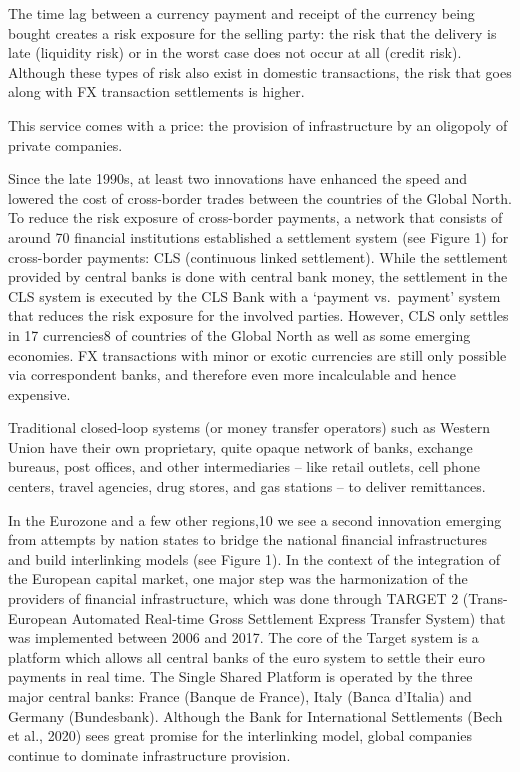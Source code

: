 \documentclass[
]{book}
\begin{document}
The time lag between a currency payment and receipt of the currency being bought creates a risk exposure for the selling party: the risk that the delivery is late (liquidity risk) or in the worst case does not occur at all (credit risk). Although these types of risk also exist in domestic transactions, the risk that goes along with FX transaction settlements is higher.

This service comes with a price: the provision of infrastructure by an oligopoly of private companies.

Since the late 1990s, at least two innovations have enhanced the speed and lowered the cost of cross-border trades between the countries of the Global North. To reduce the risk exposure of cross-border payments, a network that consists of around 70 financial institutions established a settlement system (see Figure 1) for cross-border payments: CLS (continuous linked settlement). While the settlement provided by central banks is done with central bank money, the settlement in the CLS system is executed by the CLS Bank with a `payment vs.~payment' system that reduces the risk exposure for the involved parties. However, CLS only settles in 17 currencies8 of countries of the Global North as well as some emerging economies. FX transactions with minor or exotic currencies are still only possible via correspondent banks, and therefore even more incalculable and hence expensive.

Traditional closed-loop systems (or money transfer operators) such as Western Union have their own proprietary, quite opaque network of banks, exchange bureaus, post offices, and other intermediaries -- like retail outlets, cell phone centers, travel agencies, drug stores, and gas stations -- to deliver remittances.

In the Eurozone and a few other regions,10 we see a second innovation emerging from attempts by nation states to bridge the national financial infrastructures and build interlinking models (see Figure 1). In the context of the integration of the European capital market, one major step was the harmonization of the providers of financial infrastructure, which was done through TARGET 2 (Trans-European Automated Real-time Gross Settlement Express Transfer System) that was implemented between 2006 and 2017. The core of the Target system is a platform which allows all central banks of the euro system to settle their euro payments in real time. The Single Shared Platform is operated by the three major central banks: France (Banque de France), Italy (Banca d'Italia) and Germany (Bundesbank). Although the Bank for International Settlements (Bech et al., 2020) sees great promise for the interlinking model, global companies continue to dominate infrastructure provision.
\end{document}
